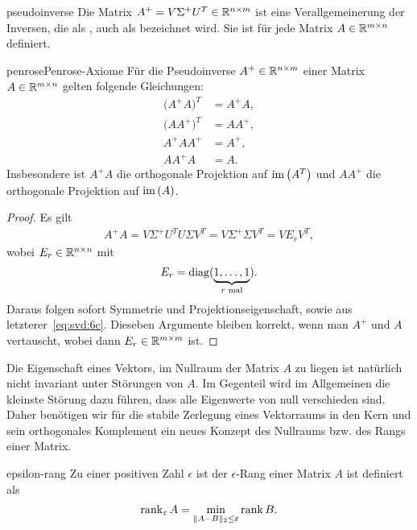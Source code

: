 \begin{Definition}{pseudoinverse}
  Die Matrix $A^+ = V\Sigma^+ U^T \in \mathbb R^{n\times m}$ ist eine
  Verallgemeinerung der Inversen, die als , auch
  als  bezeichnet wird. Sie ist für jede
  Matrix $A\in \mathbb R^{m\times n}$ definiert.
\end{Definition}

\begin{Satz*}{penrose}{Penrose-Axiome}
  Für die Pseudoinverse $A^+\in \mathbb R^{n\times m}$ einer Matrix
  $A\in \mathbb R^{m\times n}$ gelten folgende Gleichungen:
  \begin{align}
    \bigl(A^+A\bigr)^T &= A^+A,\\
    \bigl(AA^+\bigr)^T &= AA^+,\\
    \label{eq:svd:6c}
    A^+AA^+ &= A^+,\\
    AA^+A &= A.
  \end{align}
  Insbesondere ist $A^+A$ die orthogonale Projektion auf $\operatorname{im}\left(A^T\right)$
  und $AA^+$ die orthogonale Projektion auf $\operatorname{im}\left(A\right)$.
\end{Satz*}

\begin{proof}
  Es gilt
  \begin{gather}
    A^+A = V\Sigma^+U^T U \Sigma V^T = V \Sigma^+\Sigma V^T = V E_r V^T,
  \end{gather}
  wobei $E_r\in \mathbb R^{n\times n}$ mit
  \begin{gather}
    E_r = \operatorname{diag}(\underbrace{1,\dots,1}_{r \text{ mal}}).
  \end{gather}
  Daraus folgen sofort Symmetrie und Projektionseigenschaft, sowie aus
  letzterer~\eqref{eq:svd:6c}. Dieseben Argumente bleiben korrekt,
  wenn man $A^+$ und $A$ vertauscht, wobei dann
  $E_r\in \mathbb R^{m\times m}$ ist.
\end{proof}

\begin{remark}
  Die Eigenschaft eines Vektors, im Nullraum der Matrix $A$ zu liegen
  ist natürlich nicht invariant unter Störungen von $A$. Im Gegenteil
  wird im Allgemeinen die kleinste Störung dazu führen, dass alle
  Eigenwerte von null verschieden sind. Daher benötigen wir für die
  stabile Zerlegung eines Vektorraums in den Kern und sein
  orthogonales Komplement ein neues Konzept des Nullraums bzw. des
  Rangs einer Matrix.
\end{remark}

\begin{Definition}{epsilon-rang}
  Zu einer positiven Zahl $\epsilon$ ist der $\epsilon$-Rang einer
  Matrix $A$ ist definiert als
  \begin{gather}
    \operatorname{rank}_\varepsilon{A} = \min_{\lVert A-B\rVert_2\le\varepsilon} \operatorname{rank} B.
  \end{gather}
\end{Definition}

